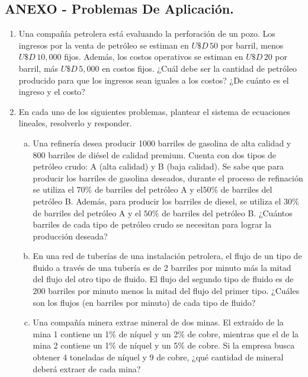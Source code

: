 \documentclass[11pt]{article}
\begin{document}
\newpage
\subsection*{ANEXO - Problemas De Aplicación.}
\begin{enumerate}[\hspace{-7mm} 1) ]
\item Una compañía petrolera está evaluando la perforación de un pozo. Los ingresos por la venta de petróleo se estiman en \( U\$D \,50 \) por barril, menos \( U\$D \,10,000 \) fijos. Además, los costos operativos se estiman en \( U\$D \,20 \) por barril, más \( U\$D \,5,000 \) en costos fijos. ¿Cuál debe ser la cantidad de petróleo producido para que los ingresos sean iguales a los costos? ¿De cuánto es el ingreso y el costo?


\item  En cada uno de los siguientes problemas, plantear el sistema de ecuaciones lineales, resolverlo
y responder.
\begin{enumerate}[a) ]
    \item Una refinería desea producir 1000 barriles de gasolina de alta calidad y 800 barriles de diésel de calidad premium. Cuenta con dos tipos de petróleo crudo: A (alta calidad) y B (baja calidad). Se sabe que para producir los barriles de gasolina deseados, durante
el proceso de refinación se utiliza el $70 \%$ de barriles del petróleo A y el$ 50 \%$  de barriles del petróleo B. Además, para producir los barriles de diesel, se utiliza el $30 \%$ de barriles del petróleo A y el $50 \%$ de barriles del petróleo B. ¿Cuántos barriles de cada tipo de petróleo crudo se necesitan para lograr la producción deseada? 



    \item En una red de tuberías de una instalación petrolera, el flujo de un tipo de fluido a través de una tubería es de 2 barriles por minuto más la mitad del flujo del otro tipo de fluido. El flujo del segundo tipo de fluido es de 200 barriles por minuto menos la mitad del flujo del primer tipo. ¿Cuáles son los flujos (en barriles por minuto) de cada tipo de fluido?

    
    \item Una compañía minera extrae mineral de dos minas. El extraído de la mina 1 contiene un 1\% de níquel y un 2\% de cobre, mientras que el de la mina 2 contiene un 1\% de níquel y un 5\% de cobre. Si la empresa busca obtener 4 toneladas de níquel y 9 de cobre, ¿qué cantidad de mineral deberá extraer de cada mina?
\end{enumerate}













\end{enumerate}
\end{document}
